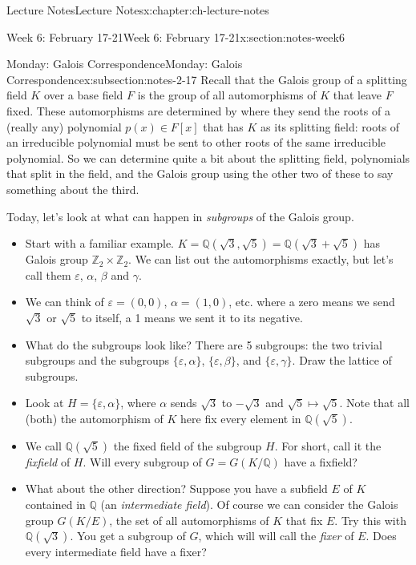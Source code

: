 \documentclass[oneside,11pt,]{book}
\begin{document}
\begin{chapterptx}{Lecture Notes}{}{Lecture Notes}{}{}{x:chapter:ch-lecture-notes}
\begin{sectionptx}{Week 6: February 17-21}{}{Week 6: February 17-21}{}{}{x:section:notes-week6}
\begin{subsectionptx}{Monday: Galois Correspondence}{}{Monday: Galois Correspondence}{}{}{x:subsection:notes-2-17}
Recall that the Galois group of a splitting field \(K\) over a base field \(F\) is the group of all automorphisms of \(K\) that leave \(F\) fixed. These automorphisms are determined by where they send the roots of a (really any) polynomial \(p(x) \in F[x]\) that has \(K\) as its splitting field: roots of an irreducible polynomial must be sent to other roots of the same irreducible polynomial. So we can determine quite a bit about the splitting field, polynomials that split in the field, and the Galois group using the other two of these to say something about the third.%
\par
Today, let’s look at what can happen in \emph{subgroups} of the Galois group.%
\par
%
\begin{itemize}[label=\textbullet]
\item{}Start with a familiar example. \(K = \mathbb Q(\sqrt{3}, \sqrt{5}) = \mathbb Q(\sqrt{3}+\sqrt{5})\) has Galois group \(\mathbb Z_2\times \mathbb Z_2\). We can list out the automorphisms exactly, but let’s call them \(\varepsilon\),            \(\alpha\),            \(\beta\) and \(\gamma\).%
\item{}We can think of \(\varepsilon = (0,0)\),            \(\alpha = (1,0)\), etc. where a zero means we send \(\sqrt{3}\) or \(\sqrt{5}\) to itself, a 1 means we sent it to its negative.%
\item{}What do the subgroups look like? There are 5 subgroups: the two trivial subgroups and the subgroups \(\{\varepsilon, \alpha\}\),            \(\{\varepsilon, \beta\}\), and \(\{\varepsilon, \gamma\}\). Draw the lattice of subgroups.%
\item{}Look at \(H = \{\varepsilon, \alpha\}\), where \(\alpha\) sends \(\sqrt{3}\) to \(-\sqrt{3}\) and \(\sqrt{5} \mapsto \sqrt{5}\). Note that all (both) the automorphism of \(K\) here fix every element in \(\mathbb Q(\sqrt{5})\).%
\item{}We call \(\mathbb Q(\sqrt{5})\) the fixed field of the subgroup \(H\). For short, call it the \emph{fixfield} of \(H\). Will every subgroup of \(G = G(K/\mathbb Q)\) have a fixfield?%
\item{}What about the other direction? Suppose you have a subfield \(E\) of \(K\) contained in \(\mathbb Q\) (an \emph{intermediate field}). Of course we can consider the Galois group \(G(K/E)\), the set of all automorphisms of \(K\) that fix \(E\). Try this with \(\mathbb Q(\sqrt{3})\). You get a subgroup of \(G\), which will will call the \emph{fixer} of \(E\). Does every intermediate field have a fixer?%

\end{itemize}
\end{subsectionptx}
\end{sectionptx}
\end{chapterptx}
\end{document}
